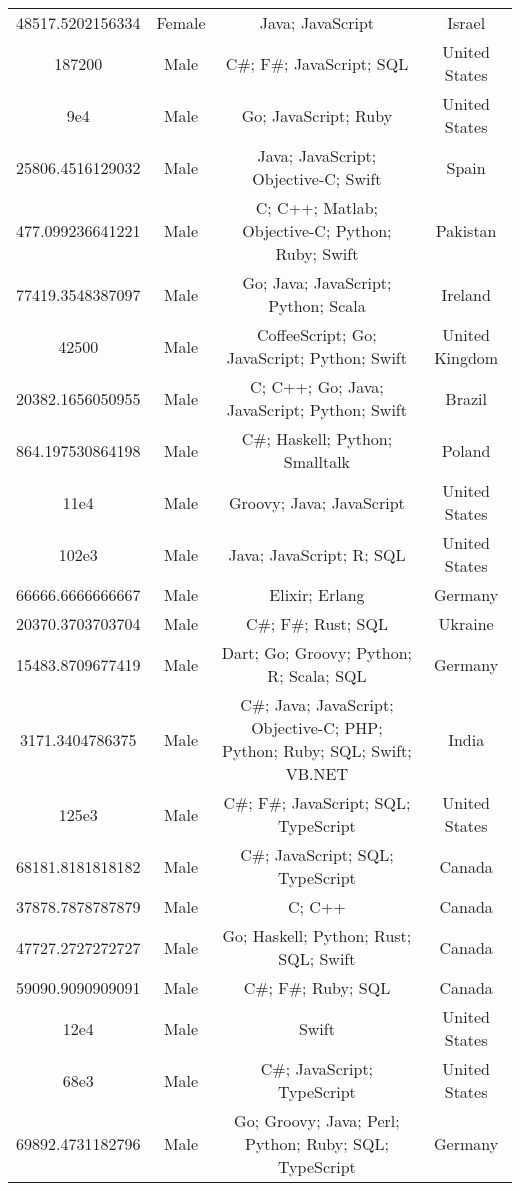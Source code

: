 \begin{center}
\begin{tabular}{ |c|c|c|c| }
48517.5202156334  &  Female  &  Java; JavaScript  &  Israel  \\ 
187200  &  Male  &  C\#; F\#; JavaScript; SQL  &  United States  \\ 
9e4  &  Male  &  Go; JavaScript; Ruby  &  United States  \\ 
25806.4516129032  &  Male  &  Java; JavaScript; Objective-C; Swift  &  Spain  \\ 
477.099236641221  &  Male  &  C; C++; Matlab; Objective-C; Python; Ruby; Swift  &  Pakistan  \\ 
77419.3548387097  &  Male  &  Go; Java; JavaScript; Python; Scala  &  Ireland  \\ 
42500  &  Male  &  CoffeeScript; Go; JavaScript; Python; Swift  &  United Kingdom  \\ 
20382.1656050955  &  Male  &  C; C++; Go; Java; JavaScript; Python; Swift  &  Brazil  \\ 
864.197530864198  &  Male  &  C\#; Haskell; Python; Smalltalk  &  Poland  \\ 
11e4  &  Male  &  Groovy; Java; JavaScript  &  United States  \\ 
102e3  &  Male  &  Java; JavaScript; R; SQL  &  United States  \\ 
66666.6666666667  &  Male  &  Elixir; Erlang  &  Germany  \\ 
20370.3703703704  &  Male  &  C\#; F\#; Rust; SQL  &  Ukraine  \\ 
15483.8709677419  &  Male  &  Dart; Go; Groovy; Python; R; Scala; SQL  &  Germany  \\ 
3171.3404786375  &  Male  &  C\#; Java; JavaScript; Objective-C; PHP; Python; Ruby; SQL; Swift; VB.NET  &  India  \\ 
125e3  &  Male  &  C\#; F\#; JavaScript; SQL; TypeScript  &  United States  \\ 
68181.8181818182  &  Male  &  C\#; JavaScript; SQL; TypeScript  &  Canada  \\ 
37878.7878787879  &  Male  &  C; C++  &  Canada  \\ 
47727.2727272727  &  Male  &  Go; Haskell; Python; Rust; SQL; Swift  &  Canada  \\ 
59090.9090909091  &  Male  &  C\#; F\#; Ruby; SQL  &  Canada  \\ 
12e4  &  Male  &  Swift  &  United States  \\ 
68e3  &  Male  &  C\#; JavaScript; TypeScript  &  United States  \\ 
69892.4731182796  &  Male  &  Go; Groovy; Java; Perl; Python; Ruby; SQL; TypeScript  &  Germany  \\ 

\end{tabular}
\end{center}

